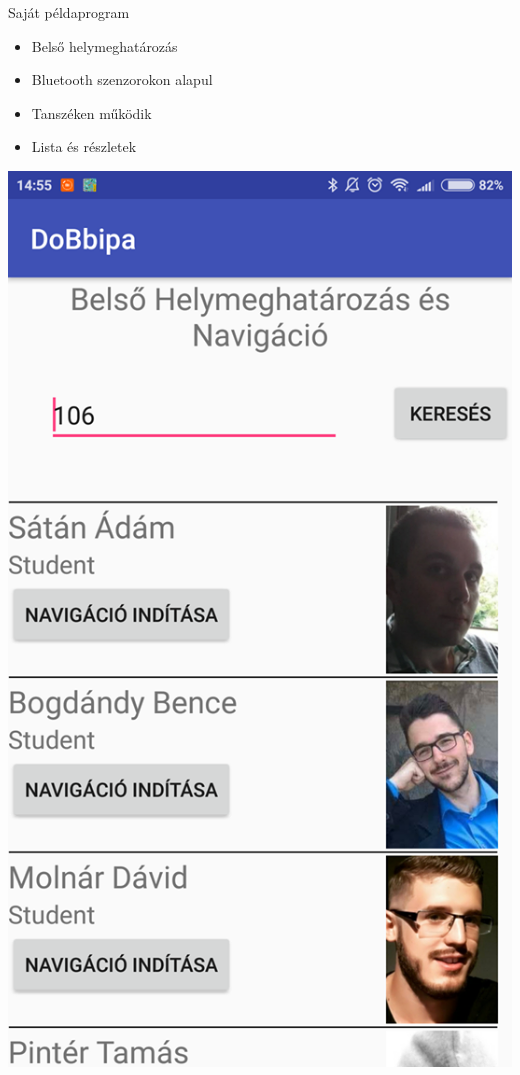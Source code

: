 \documentclass{beamer}
\begin{document}
\begin{frame}[fragile]{Saját példaprogram}
	\begin{minipage}{0.49\textheight}
		\begin{itemize}
			\item Belső helymeghatározás
			\item Bluetooth szenzorokon alapul
			\item Tanszéken működik
			\item Lista és részletek 
		\end{itemize}
	\end{minipage}
	\begin{minipage}{0.49\textwidth}
		\centering
		\includegraphics[width=.8\linewidth]{figures/faszok.png}
	\end{minipage}
\end{frame}
\end{document}
